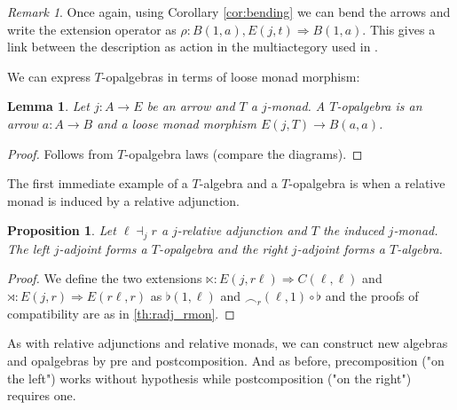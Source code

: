 \documentclass[10pt,a4paper]{article}
\newcommand{\To}{\Rightarrow}
\theoremstyle{plain}
\newtheorem{proposition}[theorem]{Proposition}
\newtheorem{lemma}[theorem]{Lemma}
\theoremstyle{definition}
\theoremstyle{remark}
\newtheorem{remark}[theorem]{Remark}
\begin{document}
\begin{remark}
    \label{rem:ropalg_act}
    Once again, using Corollary \ref{cor:bending} we can bend the arrows and write the extension operator as $\rho : B(1, a), E(j, t) \To B(1, a)$. This gives a link between the description as action in the multiactegory used in \cite[Theorem 6.22]{arkor2024formaltheoryrelativemonads}.
\end{remark}

We can express $T$-opalgebras in terms of loose monad morphism:

\begin{lemma}
    \label{lem:opalg_lmnd_mor}
    Let $j : A \to E$ be an arrow and $T$ a $j$-monad. A $T$-opalgebra is an arrow $a : A \to B$ and a loose monad morphism $E(j, T) \to B(a, a)$.
\end{lemma}

\begin{proof}
    Follows from $T$-opalgebra laws (compare the diagrams).
\end{proof}

The first immediate example of a $T$-algebra and a $T$-opalgebra is when a relative monad is induced by a relative adjunction.

\begin{proposition}
    \label{prop:radj_alg_opalg}
    Let $\ell\dashv_jr$ a $j$-relative adjunction and $T$ the induced $j$-monad. The left $j$-adjoint forms a $T$-opalgebra and the right $j$-adjoint forms a $T$-algebra.
\end{proposition}

\begin{proof}
    We define the two extensions $\ltimes : E(j, r\ell) \To C(\ell, \ell)$ and $\rtimes : E(j, r) \To E(r\ell, r)$ as $\flat(1, \ell)$ and $\smallfrown_r(\ell, 1)\circ\flat$ and the proofs of compatibility are as in \ref{th:radj_rmon}.
\end{proof}

As with relative adjunctions and relative monads, we can construct new algebras and opalgebras by pre and postcomposition. And as before, precomposition ("on the left") works without hypothesis while postcomposition ("on the right") requires one.
\end{document}
